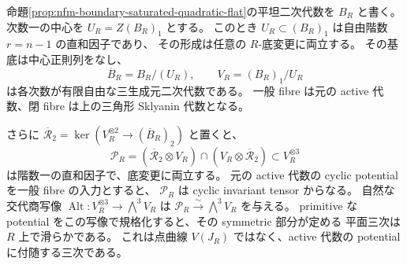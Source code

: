 \begin{proposition}
\label{prop:nfm-boundary-saturated-active-potential}
命題\ref{prop:nfm-boundary-saturated-quadratic-flat}の平坦二次代数を $B_R$ と書く。
次数一の中心を $U_R=Z(B_R)_1$ とする。
このとき $U_R\subset(B_R)_1$ は自由階数 $r=n-1$ の直和因子であり、
その形成は任意の $R$-底変更に両立する。
その基底は中心正則列をなし、
\[
 \overline B_R=B_R/(U_R),\qquad V_R=(B_R)_1/U_R
\]
は各次数が有限自由な三生成元二次代数である。
一般 fibre は元の active 代数、閉 fibre は上の三角形 Sklyanin 代数となる。

さらに $\overline{\mathcal R}_2=\ker(V_R^{\otimes2}\to(\overline B_R)_2)$ と置くと、
\[
 \mathcal P_R=
 (\overline{\mathcal R}_2\otimes V_R)
        \cap(V_R\otimes\overline{\mathcal R}_2)
       \subset V_R^{\otimes3}
\]
は階数一の直和因子で、底変更に両立する。
元の active 代数の cyclic potential を一般 fibre の入力とすると、
$\mathcal P_R$ は cyclic invariant tensor からなる。
自然な交代商写像
$\operatorname{Alt}:V_R^{\otimes3}\to\bigwedge^3V_R$ は
$\mathcal P_R\xrightarrow{\sim}\bigwedge^3V_R$ を与える。
primitive な potential をこの写像で規格化すると、その symmetric 部分が定める
平面三次は $R$ 上で滑らかである。
これは点曲線 $V(J_R)$ ではなく、active 代数の potential に付随する三次である。
\end{proposition}

